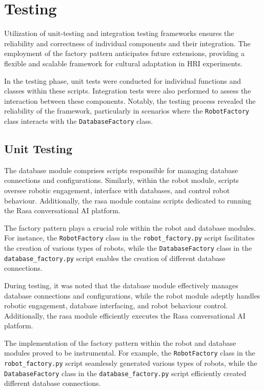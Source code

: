 \section{Testing}

Utilization of unit-testing and integration testing frameworks ensures the reliability and correctness of individual components and their integration. The employment of the factory pattern anticipates future extensions, providing a flexible and scalable framework for cultural adaptation in HRI experiments.

In the testing phase, unit tests were conducted for individual functions and classes within these scripts. Integration tests were also performed to assess the interaction between these components. Notably, the testing process revealed the reliability of the framework, particularly in scenarios where the \texttt{RobotFactory} class interacts with the \texttt{DatabaseFactory} class.

\subsection{Unit Testing}

The database module comprises scripts responsible for managing database connections and configurations. Similarly, within the robot module, scripts oversee robotic engagement, interface with databases, and control robot behaviour. Additionally, the rasa module contains scripts dedicated to running the Rasa conversational AI platform.

The factory pattern plays a crucial role within the robot and database modules. For instance, the \texttt{RobotFactory} class in the \texttt{robot\_factory.py} script facilitates the creation of various types of robots, while the \texttt{DatabaseFactory} class in the \texttt{database\_factory.py} script enables the creation of different database connections.

During testing, it was noted that the database module effectively manages database connections and configurations, while the robot module adeptly handles robotic engagement, database interfacing, and robot behaviour control. Additionally, the rasa module efficiently executes the Rasa conversational AI platform.

The implementation of the factory pattern within the robot and database modules proved to be instrumental. For example, the \texttt{RobotFactory} class in the \texttt{robot\_factory.py} script seamlessly generated various types of robots, while the \texttt{DatabaseFactory} class in the \texttt{database\_factory.py} script efficiently created different database connections.

